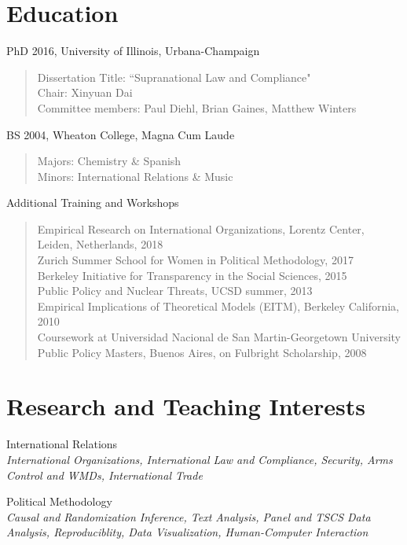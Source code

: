 \documentclass[margin, 10pt]{CVStyleTemplate}\usepackage[]{graphicx}\usepackage[]{color}
\begin{document}
\begin{resume}
\section{Education}
PhD 2016, University of Illinois, Urbana-Champaign 
  \begin{quotation} \noindent
  Dissertation Title: ``Supranational Law and Compliance"\\
  Chair: Xinyuan Dai\\
  Committee members: Paul Diehl, Brian Gaines, Matthew Winters
  \end{quotation}
BS 2004, Wheaton College, Magna Cum Laude 
  \begin{quotation} \noindent
  Majors: Chemistry \& Spanish \\
  Minors: International Relations \& Music
  \end{quotation}
%
Additional Training and Workshops  \begin{quotation} \noindent 
  Empirical Research on International Organizations, Lorentz Center, Leiden, Netherlands, 2018 \\[6pt] 
  Zurich Summer School for Women in Political Methodology, 2017\\[6pt]
  Berkeley Initiative for Transparency in the Social Sciences, 2015\\[6pt]%
  Public Policy and Nuclear Threats, UCSD summer, 2013 \\[6pt]%
  Empirical Implications of Theoretical Models (EITM), Berkeley California, 2010 \\[6pt]%
  Coursework at Universidad Nacional de San Martin-Georgetown University Public Policy Masters, Buenos  Aires, on Fulbright Scholarship, 2008\\[6pt]%
  \end{quotation}


\section{Research and Teaching Interests}

International Relations\\
\emph{International Organizations, International Law and Compliance, Security, Arms Control and WMDs, International Trade}

Political Methodology\\
\emph{Causal and Randomization Inference, Text Analysis, Panel and TSCS Data Analysis, Reproduciblity, Data Visualization, Human-Computer Interaction}


\end{resume}
\end{document}
